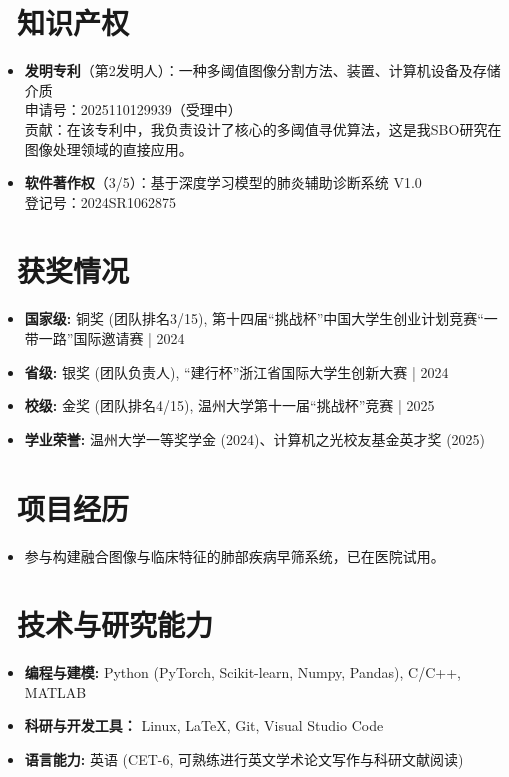 \documentclass{resume}
\begin{document}
\section{\faKey\ 知识产权}
\begin{itemize}
  \item \textbf{发明专利}（第2发明人）：一种多阈值图像分割方法、装置、计算机设备及存储介质\\
  申请号：2025110129939（受理中）\\
  贡献：在该专利中，我负责设计了核心的多阈值寻优算法，这是我SBO研究在图像处理领域的直接应用。
  \item \textbf{软件著作权}（3/5）：基于深度学习模型的肺炎辅助诊断系统 V1.0\\
  登记号：2024SR1062875
\end{itemize}

\section{\faTrophy\ 获奖情况}
\begin{itemize}[parsep=0.5ex]
  \item \textbf{国家级:} 铜奖 (团队排名3/15), 第十四届“挑战杯”中国大学生创业计划竞赛“一带一路”国际邀请赛 | 2024
  \item \textbf{省级:} 银奖 (团队负责人), “建行杯”浙江省国际大学生创新大赛 | 2024
  \item \textbf{校级:} 金奖 (团队排名4/15), 温州大学第十一届“挑战杯”竞赛 | 2025
  \item \textbf{学业荣誉:} 温州大学一等奖学金 (2024)、计算机之光校友基金英才奖 (2025)
\end{itemize}

\section{\faUsers\ 项目经历}
\begin{itemize}
  \item 参与构建融合图像与临床特征的肺部疾病早筛系统，已在医院试用。
\end{itemize}

\section{\faCogs\ 技术与研究能力}
\begin{itemize}[parsep=0.5ex]
  \item \textbf{编程与建模:} Python (PyTorch, Scikit-learn, Numpy, Pandas), C/C++, MATLAB
  \item \textbf{科研与开发工具：} Linux, LaTeX, Git, Visual Studio Code
  \item \textbf{语言能力:} 英语 (CET-6, 可熟练进行英文学术论文写作与科研文献阅读)
\end{itemize}
\end{document}
